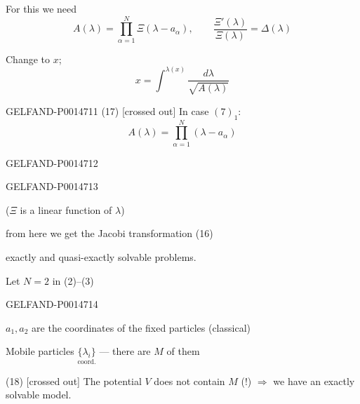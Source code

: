 For this we need
\begin{equation*}
A(\lambda)=\prod_{\alpha=1}^N\Xi(\lambda-a_\alpha),\qquad
\frac{\Xi'(\lambda)}{\Xi(\lambda)}=\Delta(\lambda)
\tag{15}
\end{equation*}

Change to \(x\);
\begin{equation*}
x=\int^{\lambda(x)}\frac{d\lambda}{\sqrt{A(\lambda)}}
\tag{16}
\end{equation*}


\begin{GelfandAdjacentEvidence}{GELFAND-P001471}{1}
(17) [crossed out] In case \((7)_1\):
\[
A(\lambda)=\prod_{\alpha=1}^{N}(\lambda-a_\alpha)
\]
\end{GelfandAdjacentEvidence}
\begin{GelfandAdjacentEvidence}{GELFAND-P001471}{2}


\end{GelfandAdjacentEvidence}
\begin{GelfandAdjacentEvidence}{GELFAND-P001471}{3}


(\(\boxed{\Xi}\) is a linear function of \(\lambda\))

from here we get the Jacobi transformation (16)

exactly and quasi-exactly solvable problems.

Let \(N=2\) in (2)–(3)

\end{GelfandAdjacentEvidence}
\begin{GelfandAdjacentEvidence}{GELFAND-P001471}{4}


\(a_1,a_2\) are the coordinates of the fixed particles (classical)

Mobile particles \(\underset{\text{coord.}}{\{\lambda_i\}}\) — there are \(M\) of them

(18) [crossed out] The potential \(V\) does not contain \(M\) (!) \(\Longrightarrow\) we have an exactly solvable model.

\end{GelfandAdjacentEvidence}

